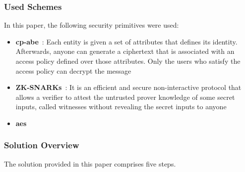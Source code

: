 \subsubsection{Used Schemes}
In this paper, the following security primitives were used:

\begin{itemize}
    \item \textbf{\ac{cp-abe}}~\cite{bethencourt2007ciphertext}: Each entity is given a set of attributes that defines its identity.
    Afterwards, anyone can generate a ciphertext that is associated with an access policy defined over those attributes.
    Only the users who satisfy the access policy can decrypt the message
    \item \textbf{ZK-SNARKs}~\cite{ben2013succinct}: It is an efficient and secure non-interactive protocol that allows a verifier to attest the untrusted prover knowledge of some secret inputs, called witnesses without revealing the secret inputs to anyone
    \item \textbf{\ac{aes}}
\end{itemize}

\subsubsection{Solution Overview}
The solution provided in this paper comprises five steps.

